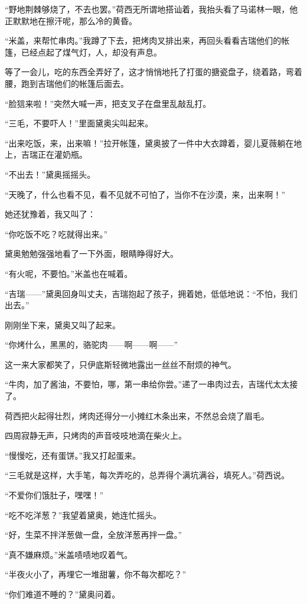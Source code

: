 \par “野地荆棘够烧了，不去也罢。”荷西无所谓地搭讪着，我抬头看了马诺林一眼，他正默默地在擦汗呢，那么冷的黄昏。
\par “米盖，来帮忙串肉。”我蹲了下去，把烤肉叉排出来，再回头看看吉瑞他们的帐篷，已经点起了煤气灯，人，却没有声息。
\par 等了一会儿，吃的东西全弄好了，这才悄悄地托了打蛋的搪瓷盘子，绕着路，弯着腰，跑到吉瑞他们的帐篷后面去。
\par “脸狺来啦！”突然大喊一声，把支叉子在盘里乱敲乱打。
\par “三毛，不要吓人！”里面黛奥尖叫起来。
\par “出来吃饭，来，出来嘛！”拉开帐篷，黛奥披了一件中大衣蹲着，婴儿夏薇躺在地上，吉瑞正在灌奶瓶。
\par “不出去！”黛奥摇摇头。
\par “天晚了，什么也看不见，看不见就不可怕了，当你不在沙漠，来，出来啊！”
\par 她还犹豫着，我又叫了：
\par “你吃饭不吃？吃就得出来。”
\par 黛奥勉勉强强地看了一下外面，眼睛睁得好大。
\par “有火呢，不要怕。”米盖也在喊着。
\par “吉瑞——”黛奥回身叫丈夫，吉瑞抱起了孩子，拥着她，低低地说：“不怕，我们出去。”
\par 刚刚坐下来，黛奥又叫了起来。
\par “你烤什么，黑黑的，骆驼肉——啊——啊——”
\par 这一来大家都笑了，只伊底斯轻微地露出一丝丝不耐烦的神气。
\par “牛肉，加了酱油，不要怕，哪，第一串给你尝。”递了一串肉过去，吉瑞代太太接了。
\par 荷西把火起得壮烈，烤肉还得分一小摊红木条出来，不然总会烧了眉毛。
\par 四周寂静无声，只烤肉的声音吱吱地滴在柴火上。
\par “慢慢吃，还有蛋饼。”我又打起蛋来。
\par “三毛就是这样，大手笔，每次弄吃的，总弄得个满坑满谷，填死人。”荷西说。
\par “不爱你们饿肚子，嘿嘿！”
\par “吃不吃洋葱？”我望着黛奥，她连忙摇头。
\par “好，生菜不拌洋葱做一盘，全放洋葱再拌一盘。”
\par “真不嫌麻烦。”米盖啧啧地叹着气。
\par “半夜火小了，再埋它一堆甜薯，你不每次都吃？”
\par “你们难道不睡的？”黛奥问着。
